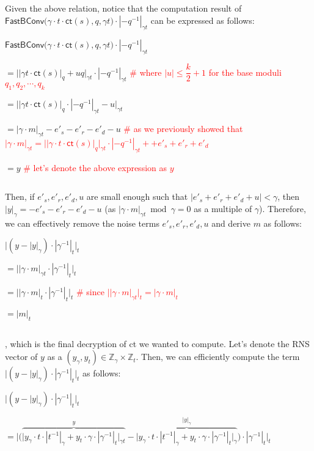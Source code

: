 $ $

Given the above relation, notice that the computation result of $\textsf{FastBConv}\bm(\gamma\cdot t\cdot \textsf{ct}(s), q, \gamma t\bm) \cdot |-q^{-1}|_{\gamma t}$ can be expressed as follows: 

$\textsf{FastBConv}\bm(\gamma\cdot t\cdot \textsf{ct}(s), q, \gamma t\bm) \cdot |-q^{-1}|_{\gamma t}$

$ = \Big||\gamma t \cdot \textsf{ct}(s)|_q + uq\Big|_{\gamma t} \cdot |-q^{-1}|_{\gamma t} $ \textcolor{red}{\# where $|u| \leq \dfrac{k}{2}+1$ for the base moduli $q_1, q_2, \cdots, q_k$}

$ =  \Big||\gamma t \cdot \textsf{ct}(s)|_q \cdot |-q^{-1}|_{\gamma t}  - u\Big|_{\gamma t}$

$= |\gamma \cdot m|_{\gamma t}  - e'_s - e'_r - e'_d - u$ \textcolor{red}{ \# as we previously showed that $|\gamma \cdot m|_{\gamma t} = \Big||\gamma\cdot t\cdot \textsf{ct}(s)|_q\Big|_{\gamma t} \cdot |-q^{-1}|_{\gamma t} +  + e'_s + e'_r + e'_d$}

$= y$ \textcolor{red}{ \# let's denote the above expression as $y$}

$ $

Then, if $e'_s, e'_r, e'_d, u$ are small enough such that $|e'_s + e'_r + e'_d + u| < \gamma$, then $|y|_{\gamma} = -e'_s -e'_r - e'_d - u$ (as $|\gamma \cdot m|_{\gamma t} \bmod \gamma = 0$ as a multiple of $\gamma$). Therefore, we can effectively remove the noise terms $e'_s, e'_r, e'_d, u$ and derive $m$ as follows:

$\bm{\Big|}(y - |y|_{\gamma}) \cdot |\gamma^{-1}|_t\bm{\Big|}_t$

$ = \bm{\Big|}|\gamma\cdot m|_{\gamma t} \cdot |\gamma^{-1}|_t\bm{\Big|}_t$

$ = \bm{\Big|}|\gamma\cdot m|_{t} \cdot |\gamma^{-1}|_t\bm{\Big|}_t$ \textcolor{red}{ \# since $\Big||\gamma\cdot m|_{\gamma t}\Big|_t = |\gamma\cdot m|_{t}$}

$= |m|_t$

$ $

, which is the final decryption of \textsf{ct} we wanted to compute. Let's denote the RNS vector of $y$ as a $(y_{\gamma}, y_{t}) \in \mathbb{Z}_{\gamma} \times \mathbb{Z}_{t}$. Then, we can efficiently compute the term $\Big|(y - |y|_{\gamma}) \cdot |\gamma^{-1}|_t\Big|_t$ as follows:

$\Big|(y - |y|_{\gamma}) \cdot |\gamma^{-1}|_t\Big|_t$

$= \Bigg|\Big( \overbrace{\Big|y_{\gamma}\cdot t \cdot |t^{-1}|_{\gamma} + y_{t}\cdot \gamma \cdot |\gamma^{-1}|_{t} \Big|_{\gamma t}}^{y} - \overbrace{\Big|y_{\gamma}\cdot t \cdot |t^{-1}|_{\gamma} + y_{t}\cdot \gamma \cdot |\gamma^{-1}|_{t}\Big|_{\gamma}}^{|y|_{\gamma}}\Big) \cdot |\gamma^{-1}|_t\Bigg|_t$

